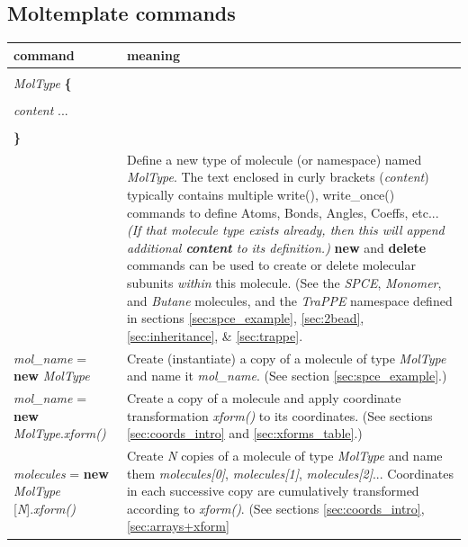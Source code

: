 \documentclass[11pt]{article}
\begin{document}
\subsection{Moltemplate commands}

\begin{longtable}[h]{l|p{9cm}}
\textbf{command} & \textbf{meaning}
\\
\hline
\hline
\begin{tabular}[t]{l}
\\
\textit{MolType} \textbf{\{} \\
\\
\hspace{0.35cm} \textit{content} ... \\
\\
\textbf{\}} \\
\end{tabular}
& 
Define a new type of molecule (or namespace) named \textit{MolType}.
The text enclosed in curly brackets (\textit{content})
typically contains multiple write(), write\_once()
commands to define Atoms, Bonds, Angles, Coeffs, etc...
\textit{(If that molecule type exists already, 
then this will append additional \textbf{content} to its definition.)}
\textbf{new} and \textbf{delete} commands can be used 
to create or delete molecular subunits \textit{within} this molecule.
(See the \textit{SPCE}, \textit{Monomer}, and \textit{Butane} 
 molecules, and the \textit{TraPPE} namespace 
 defined in sections \ref{sec:spce_example}, \ref{sec:2bead},
 \ref{sec:inheritance}, \& \ref{sec:trappe}.
\\
\hline
\textit{mol\_name} = \textbf{new} \textit{MolType} &
Create (instantiate) a copy of a molecule of type \textit{MolType}
and name it \textit{mol\_name}.
(See section \ref{sec:spce_example}.)
\\
\hline
\textit{mol\_name} = \textbf{new} \textit{MolType}.\textit{xform()} &
Create a copy of a molecule and
apply coordinate transformation \textit{xform()} to its coordinates.
(See sections \ref{sec:coords_intro} and \ref{sec:xforms_table}.)
\\
\hline
\textit{molecules} = 
  \textbf{new} \textit{MolType} [\textit{N}].\textit{xform()}&
Create \textit{N} copies of a molecule of type \textit{MolType}
and name them 
\textit{molecules[0]}, \textit{molecules[1]}, \textit{molecules[2]}...
Coordinates in each successive copy are cumulatively transformed 
according to \textit{xform()}.
(See sections \ref{sec:coords_intro}, \ref{sec:arrays+xform}

\end{longtable}
\end{document}
